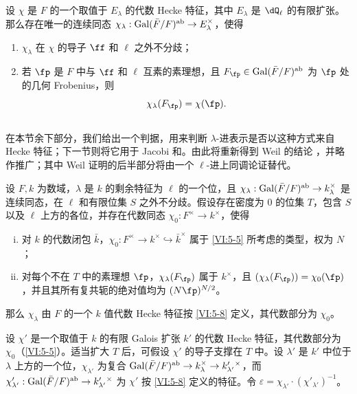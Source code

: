 \begin{theorem_}[{\cite{se68}}]\label{VI:5-8}
设 $\chi$ 是 $F$ 的一个取值于 $E_\lambda$ 的代数 Hecke 特征，其中 $E_\lambda$ 是 $\dQ_\ell$ 的有限扩张。那么存在唯一的连续同态
$\chi_\lambda:\operatorname{Gal}(\bar F/F)^\textnormal{ab}\to E_\lambda^\times$，使得
\begin{enumerate}[\indent (i)]
\item $\chi_\lambda$ 在 $\chi$ 的导子 $\ff$ 和 $\ell$ 之外不分歧；
\item 若 $\fp$ 是 $F$ 中与 $\ff$ 和 $\ell$ 互素的素理想，且 $F_\fp\in\gal(\bar F/F)^\textnormal{ab}$ 为 $\fp$ 处的几何 Frobenius，则
\[\chi_\lambda(F_\fp)=\chi(\fp).\]
\end{enumerate}
\end{theorem_}

\subsection{}\label{VI:5-9}
在本节余下部分，我们给出一个判据，用来判断 $\lambda$-进表示是否以这种方式来自 Hecke 特征；下一节则将它用于 Jacobi 和。由此将重新得到 Weil 的结论 \cite{we52,we74-2}，并略作推广；其中 Weil 证明的后半部分将由一个 $\ell$-进上同调论证替代。

\begin{theorem_}\label{VI:5-10}
设 $F,k$ 为数域，$\lambda$ 是 $k$ 的剩余特征为 $\ell$ 的一个位，且
$\chi_\lambda:\operatorname{Gal}(\bar F/F)^\textnormal{ab}\to k_\lambda^\times$
是连续同态，在 $\ell$ 和有限位集 $S$ 之外不分歧。假设存在密度为 $0$ 的位集 $T$，包含 $S$ 以及 $\ell$ 上方的各位，并存在代数同态 $\chi_0:F^\times\to k^\times$，使得
\begin{enumerate}[(i)]
\item 对 $k$ 的代数闭包 $\bar k$，$\chi_0:F^\times\to k^\times\hookrightarrow\bar k^\times$ 属于 \ref{VI:5-5} 所考虑的类型，权为 $N$；
\item 对每个不在 $T$ 中的素理想 $\fp$，$\chi_\lambda(F_\fp)$ 属于 $k^\times$，且 $(\chi_\lambda(F_\fp))=\chi_0(\fp)$，并且其所有复共轭的绝对值均为 $(N\fp)^{N/2}$。
\end{enumerate}
那么 $\chi_\lambda$ 由 $F$ 的一个 $k$ 值代数 Hecke 特征按 \ref{VI:5-8} 定义，其代数部分为 $\chi_0$。
\end{theorem_}
设 $\chi'$ 是一个取值于 $k$ 的有限 Galois 扩张 $k'$ 的代数 Hecke 特征，其代数部分为 $\chi_0$（\ref{VI:5-5}）。适当扩大 $T$ 后，可假设 $\chi'$ 的导子支撑在 $T$ 中。设 $\lambda'$ 是 $k'$ 中位于 $\lambda$ 上方的一个位，$\chi_{\lambda'}$ 为复合
$\operatorname{Gal}(\bar F/F)^\text{ab}\to k_\lambda^\times\to k'_{\lambda'}{}^\times$，而
$\chi'_{\lambda'}:\operatorname{Gal}(\bar F/F)^\text{ab}\to k'_{\lambda'}{}^\times$
为 $\chi'$ 按 \ref{VI:5-8} 定义的特征。令
$\varepsilon=\chi_{\lambda'}\cdot(\chi'_{\lambda'})^{-1}$。

